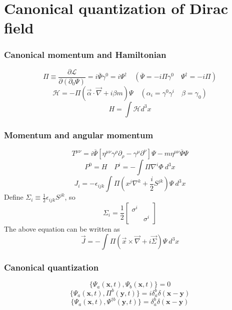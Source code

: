 \section{Canonical quantization of Dirac field}
\subsubsection{Canonical momentum and Hamiltonian}
\[\Pi \equiv \frac{\partial \mathcal{L}}{\partial(\partial_0 \Psi)} = i \overline{\Psi}\gamma^0 = i \Psi^{\dagger} \quad (\overline{\Psi} = -i \Pi \gamma^0 \quad \Psi^{\dagger} = -i \Pi)\]
\[\mathcal{H} = -\Pi (\vec{\alpha} \cdot \vec{\nabla} + i \beta m)\Psi \quad (\alpha_i = \gamma^0 \gamma^i \quad \beta = \gamma_0)\]
\[H = \int \mathcal{H} d^3x\]
\subsubsection{Momentum and angular momentum}
\[T^{\mu \nu} = i \overline{\Psi} \left[ \eta^{\mu \nu} \gamma^{\rho} \partial_{\rho} - \gamma^{\mu} \partial^{\nu} \right]\Psi -m \eta^{\mu \nu} \overline{\Psi}\Psi\]
\[P^0 = H \quad P^i = -\int \Pi \nabla^i \Phi \: d^3x\]
\[J_i = -\epsilon_{ijk} \int \Pi( x^j \nabla^k + \frac{i}{2} S^{jk}) \Psi  \: d^3x \]
Define $\Sigma_i \equiv \frac{1}{2} \epsilon_{ijk} S^{jk}$, so
\[\Sigma_i = \frac{1}{2}\left[ \begin{matrix} \sigma^i & \\ & \sigma^i \end{matrix} \right] \]
The above equation can be written as
\[\vec{J} = - \int \Pi( \vec{x} \times \vec{\nabla} + i \vec{\Sigma}) \Psi \: d^3x \]
\subsubsection{Canonical quantization}
\[\{\Psi_a(\bm{x},t),\Psi_b(\bm{x},t)\} = 0\]
\[\{\Psi_a(\bm{x},t),\Pi^b(\bm{y},t)\} = i\delta^b_a \delta(\bm{x}-\bm{y})\]
\[\{\Psi_a(\bm{x},t),\Psi^{\dagger b}(\bm{y},t)\} = \delta^b_a \delta(\bm{x}-\bm{y})\]
